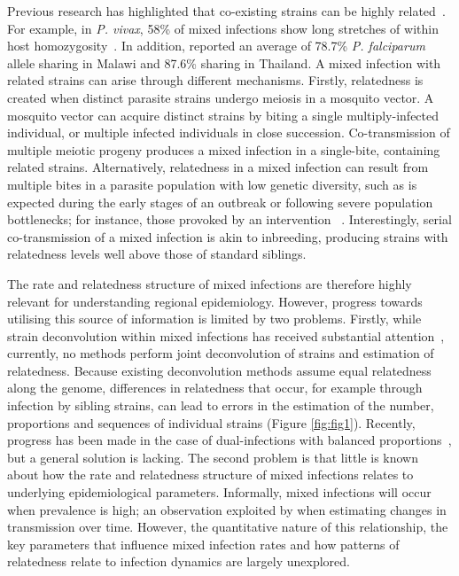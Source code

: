 \documentclass[9pt,lineno]{elife}
\begin{document}
Previous research has highlighted that co-existing strains can be highly related~\citep{Nair2014, Trevino2017}.  For example, in {\it P. vivax}, 58\% of mixed infections show long stretches of within host homozygosity~\citep{Pearson2016}. In addition, \citet{Nkhoma2012} reported an average of 78.7\% {\it P. falciparum} allele sharing in Malawi and 87.6\% sharing in Thailand. A mixed infection with related strains can arise through different mechanisms. Firstly, relatedness is created when distinct parasite strains undergo meiosis in a mosquito vector. A mosquito vector can acquire distinct strains by biting a single multiply-infected individual, or multiple infected individuals in close succession.  Co-transmission of multiple meiotic progeny produces a mixed infection in a single-bite, containing related strains.  Alternatively, relatedness in a mixed infection can result from multiple bites in a parasite population with low genetic diversity, such as is expected during the early stages of an outbreak or following severe population bottlenecks; for instance, those provoked by an intervention ~\citep{Mouzin2010, Wong2017, Daniels2015}. Interestingly, serial co-transmission of a mixed infection is akin to inbreeding, producing strains with relatedness levels well above those of standard siblings.

The rate and relatedness structure of mixed infections are therefore highly relevant for understanding regional epidemiology.  However, progress towards utilising this source of information is limited by two problems.  Firstly, while strain deconvolution within mixed infections has received substantial attention~\citep{Galinsky2015, Jack2016, Chang2017, Zhu2017}, currently, no methods perform joint deconvolution of strains and estimation of relatedness.  Because existing deconvolution methods assume equal relatedness along the genome, differences in relatedness that occur, for example through infection by sibling strains, can lead to errors in the estimation of the number, proportions and sequences of individual strains (Figure \ref{fig:fig1}).  Recently, progress has been made in the case of dual-infections with balanced proportions~\citep{Henden2016}, but a general solution is lacking.  The second problem is that little is known about how the rate and relatedness structure of mixed infections relates to underlying epidemiological parameters.  Informally, mixed infections will occur when prevalence is high; an observation exploited by \citet{Cerqueira2017} when estimating changes in transmission over time.  However, the quantitative nature of this relationship, the key parameters that influence mixed infection rates and how patterns of relatedness relate to infection dynamics are largely unexplored.
\end{document}
